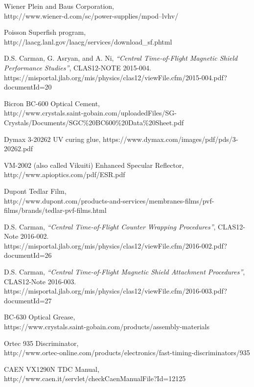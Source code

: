 \documentclass{elsart}
\begin{document}
\begin{thebibliography}{99}
Wiener Plein and Baus Corporation,\\
http://www.wiener-d.com/sc/power-supplies/mpod--lvhv/

Poisson Superfish program, \\
http://laacg.lanl.gov/laacg/services/download\_sf.phtml

D.S. Carman, G. Asryan, and A. Ni, {\it ``Central Time-of-Flight Magnetic Shield Performance 
Studies''}, CLAS12-NOTE 2015-004.\\
https://misportal.jlab.org/mis/physics/clas12/viewFile.cfm/2015-004.pdf?documentId=20

Bicron BC-600 Optical Cement,\\
http://www.crystals.saint-gobain.com/uploadedFiles/SG-Crystals/Documents/SGC\%20BC600\%20Data\%20Sheet.pdf

Dymax 3-20262 UV curing glue, https://www.dymax.com/images/pdf/pds/3-20262.pdf
  
VM-2002 (also called Vikuiti) Enhanced Specular Reflector, \\
http://www.apioptics.com/pdf/ESR.pdf

Dupont Tedlar Film,\\
http://www.dupont.com/products-and-services/membranes-films/pvf-films/brands/tedlar-pvf-films.html

D.S. Carman, {\it ``Central Time-of-Flight Counter Wrapping Procedures''}, CLAS12-Note 2016-002.\\
https://misportal.jlab.org/mis/physics/clas12/viewFile.cfm/2016-002.pdf?documentId=26

D.S. Carman, {\it ``Central Time-of-Flight Magnetic Shield Attachment Procedures''}, CLAS12-Note 
2016-003.\\
https://misportal.jlab.org/mis/physics/clas12/viewFile.cfm/2016-003.pdf?documentId=27

BC-630 Optical Grease,\\
https://www.crystals.saint-gobain.com/products/assembly-materials
  
Ortec 935 Discriminator, \\
http://www.ortec-online.com/products/electronics/fast-timing-discriminators/935

CAEN VX1290N TDC Manual,\\
http://www.caen.it/servlet/checkCaenManualFile?Id=12125
  

\end{thebibliography}
\end{document}
